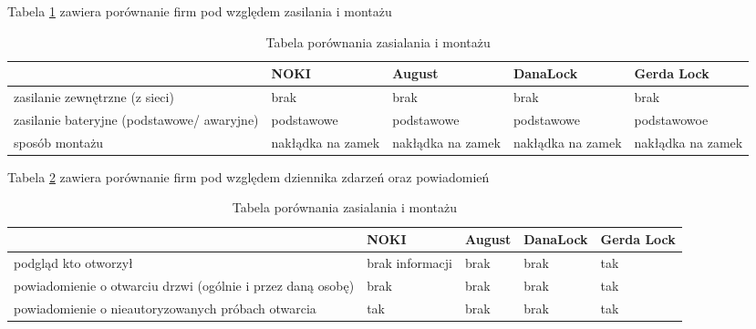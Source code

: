  
 	Tabela \ref{tab:porownanie2} zawiera porównanie firm pod względem zasilania i montażu
 \begin{longtable}[!ht]{|p{4cm}|p{}|p{}|p{}|p{}|} 
 	\caption{Tabela porównania zasialania i montażu}
 	\label{tab:porownanie2}\\
 	\hline	
 	& NOKI & August & DanaLock & Gerda Lock  \\	\hline
 	zasilanie zewnętrzne (z sieci)	
 	& brak & brak & brak & brak \\	\hline
	 zasilanie bateryjne (podstawowe/ awaryjne)	
	 & podstawowe & podstawowe & podstawowe & podstawowoe \\	\hline
 	sposób montażu	
 	& nakłądka na zamek & nakłądka na zamek & nakłądka na zamek & nakłądka na zamek \\	\hline
 \end{longtable}
 



Tabela \ref{tab:porownanie3} zawiera porównanie firm pod względem dziennika zdarzeń oraz powiadomień
\begin{longtable}[!ht]{|p{4cm}|p{}|p{}|p{}|p{}|} 
	\caption{Tabela porównania zasialania i montażu}
	\label{tab:porownanie3}\\
	\hline	
	& NOKI & August & DanaLock & Gerda Lock  \\	\hline
	podgląd kto otworzył	
	& brak informacji & brak & brak & tak \\	\hline
	
	
	powiadomienie o otwarciu drzwi (ogólnie i przez daną osobę)
	& brak & brak & brak & tak \\	\hline
	
	
	powiadomienie o nieautoryzowanych próbach otwarcia
	& tak & brak & brak & tak \\	\hline
\end{longtable}

\newpage
